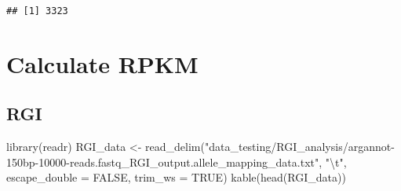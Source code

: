 \documentclass[
]{article}
\newenvironment{Shaded}{\begin{snugshade}}{\end{snugshade}}
\newcommand{\AttributeTok}[1]{\textcolor[rgb]{0.77,0.63,0.00}{#1}}
\newcommand{\ConstantTok}[1]{\textcolor[rgb]{0.00,0.00,0.00}{#1}}
\newcommand{\FunctionTok}[1]{\textcolor[rgb]{0.00,0.00,0.00}{#1}}
\newcommand{\NormalTok}[1]{#1}
\newcommand{\OtherTok}[1]{\textcolor[rgb]{0.56,0.35,0.01}{#1}}
\newcommand{\SpecialCharTok}[1]{\textcolor[rgb]{0.00,0.00,0.00}{#1}}
\newcommand{\StringTok}[1]{\textcolor[rgb]{0.31,0.60,0.02}{#1}}
\begin{document}
\begin{Shaded}
\end{Shaded}

\begin{verbatim}
## [1] 3323
\end{verbatim}

\begin{Shaded}
\end{Shaded}

\hypertarget{calculate-rpkm}{%
\section{Calculate RPKM}\label{calculate-rpkm}}

\hypertarget{rgi}{%
\subsection{RGI}\label{rgi}}

\begin{Shaded}
\begin{Highlighting}[]
\FunctionTok{library}\NormalTok{(readr)}
\NormalTok{RGI\_data }\OtherTok{\textless{}{-}} \FunctionTok{read\_delim}\NormalTok{(}\StringTok{"data\_testing/RGI\_analysis/argannot{-}150bp{-}10000{-}reads.fastq\_RGI\_output.allele\_mapping\_data.txt"}\NormalTok{, }\StringTok{"}\SpecialCharTok{\textbackslash{}t}\StringTok{"}\NormalTok{, }\AttributeTok{escape\_double =} \ConstantTok{FALSE}\NormalTok{, }\AttributeTok{trim\_ws =} \ConstantTok{TRUE}\NormalTok{)}
\FunctionTok{kable}\NormalTok{(}\FunctionTok{head}\NormalTok{(RGI\_data))}
\end{Highlighting}
\end{Shaded}
\end{document}
